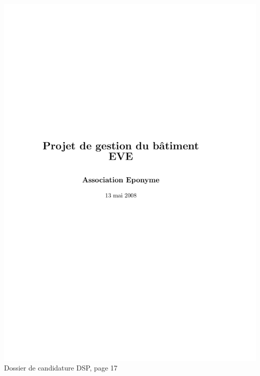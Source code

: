 \includegraphics[scale=0.85,trim=20mm 20mm 20mm 20mm,clip,page=17]{annexes/candidature_dsp.pdf} \\
Dossier de candidature DSP, page 17
\newpage
